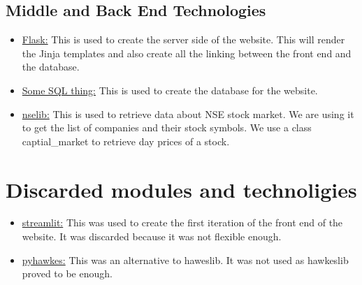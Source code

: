 \documentclass{article}
\begin{document}
\subsection{Middle and Back End Technologies}
\begin{itemize}
\item \underline{Flask:} This is used to create the server side of the website. This will render the Jinja templates and also create all the linking between the front end and the database.
\item \underline{Some SQL thing:} This is used to create the database for the website.
\item \underline{nselib:} This is used to retrieve data about NSE stock market. We are using it to get the list of companies and their stock symbols. We use a class captial\_market to retrieve day prices of a stock.
\end{itemize}
\section{Discarded modules and technoligies}
\begin{itemize}
\item \underline{streamlit:} This was used to create the first iteration of the front end of the website. It was discarded because it was not flexible enough.
\item \underline{pyhawkes:} This was an alternative to haweslib. It was not used as hawkeslib proved to be enough.
\end{itemize}
\end{document}
